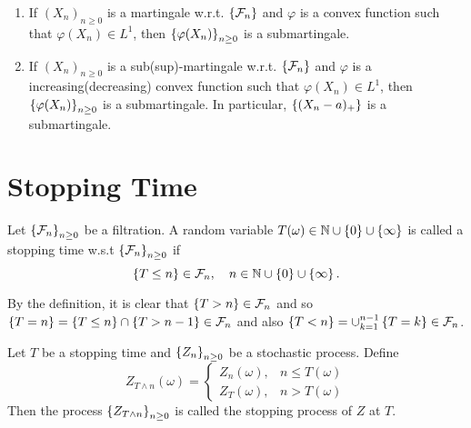 \begin{prop}
    \begin{enumerate}[label=(\arabic{*})]
        \item If $(X_n)_{n \geq 0}$ is a martingale w.r.t. $\left\{\mathcal{F}_n\right\}$ and $\varphi$ is a convex function such that $\varphi(X_n) \in L^1$, then $\left\{\varphi(X_n)\right\}_{n \geq 0}$ is a submartingale.

        \item If $(X_n)_{n \geq 0}$ is a sub(sup)-martingale w.r.t. $\left\{\mathcal{F}_n\right\}$ and  $\varphi$ is a increasing(decreasing) convex function such that $\varphi(X_n) \in L^1$, then $\left\{\varphi(X_n)\right\}_{n \geq 0}$ is a submartingale. In particular, $\left\{(X_n - a)_+\right\}$ is a submartingale.
    \end{enumerate}
\end{prop}

\section{Stopping Time}

\begin{defn}
    Let $\left\{\mathcal{F}_n\right\}_{n \geq 0}$ be a filtration. A random variable $T(\omega) \in \mathbb{N} \cup \left\{0\right\} \cup \left\{\infty\right\}$ is called a stopping time w.s.t $\left\{\mathcal{F}_n\right\}_{n \geq 0}$ if 
    \begin{equation*}
        \left\{T \leq n\right\} \in \mathcal{F}_n,\quad n \in \mathbb{N} \cup \left\{0\right\} \cup \left\{\infty\right\}.
    \end{equation*}
\end{defn}
\begin{rmk}
    By the definition, it is clear that $\left\{T > n\right\} \in \mathcal{F}_n$ and so $\left\{T = n\right\} = \left\{T \leq n\right\} \cap \left\{T > n - 1\right\} \in \mathcal{F}_n$ and also $\left\{T < n\right\} = \cup_{k=1}^{n-1}\left\{T = k\right\} \in \mathcal{F}_n$.
\end{rmk}

\begin{defn}
    Let $T$ be a stopping time and $\left\{Z_n\right\}_{n \geq 0}$ be a stochastic process. Define
    \begin{equation*}
        Z_{T \wedge n}(\omega) = \left\{
            \begin{aligned}
                Z_n(\omega),&n\leq T(\omega) \\
                Z_T(\omega),&n > T(\omega)
            \end{aligned}
        \right.
    \end{equation*}
    Then the process $\left\{Z_{T\wedge n}\right\}_{n \geq 0}$ is called the stopping process of $Z$ at $T$.
\end{defn}

